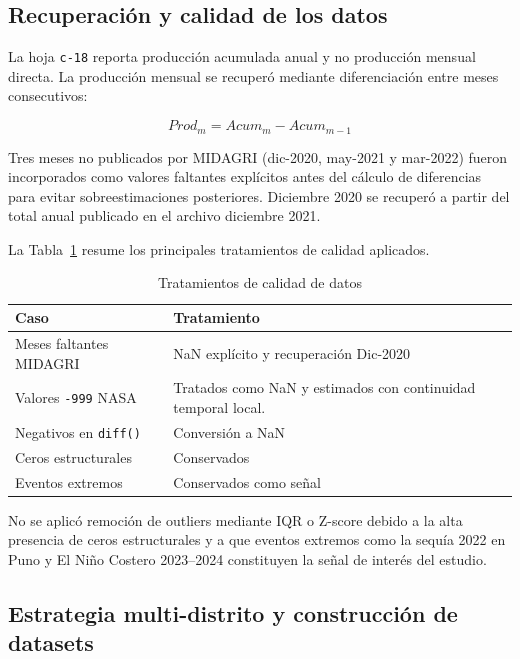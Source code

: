 \documentclass[conference]{IEEEtran}
\begin{document}
\subsection{Recuperación y calidad de los datos}

La hoja \texttt{c-18} reporta producción acumulada anual y no producción mensual directa. La producción mensual se recuperó mediante diferenciación entre meses consecutivos:

\begin{equation}
Prod_{m} = Acum_{m} - Acum_{m-1}
\end{equation}

Tres meses no publicados por MIDAGRI (dic-2020, may-2021 y mar-2022) fueron incorporados como valores faltantes explícitos antes del cálculo de diferencias para evitar sobreestimaciones posteriores. Diciembre 2020 se recuperó a partir del total anual publicado en el archivo diciembre 2021.

La Tabla~\ref{tab:calidad} resume los principales tratamientos de calidad aplicados.

\begin{table}[h]
\centering
\caption{Tratamientos de calidad de datos}
\label{tab:calidad}
\small
\begin{tabular}{p{2cm} p{4.3cm}}
\toprule
\textbf{Caso} & \textbf{Tratamiento} \\
\midrule
Meses faltantes MIDAGRI & NaN explícito y recuperación Dic-2020 \\
Valores \texttt{-999} NASA & Tratados como NaN y estimados con continuidad temporal local. \\
Negativos en \texttt{diff()} & Conversión a NaN \\
Ceros estructurales & Conservados \\
Eventos extremos & Conservados como señal \\
\bottomrule
\end{tabular}
\end{table}

No se aplicó remoción de outliers mediante IQR o Z-score debido a la alta presencia de ceros estructurales y a que eventos extremos como la sequía 2022 en Puno \cite{rcr2023} y El Niño Costero 2023--2024 \cite{senamhi2024} constituyen la señal de interés del estudio.

\subsection{Estrategia multi-distrito y construcción de datasets}
\end{document}
